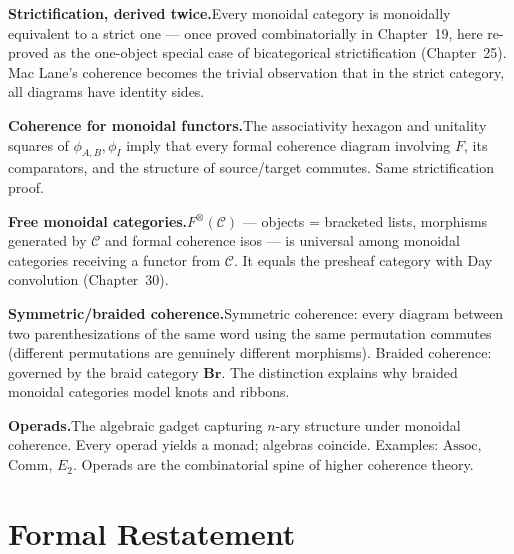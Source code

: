 \begin{summarybox}
\textbf{Strictification, derived twice.}\quad Every monoidal category is
monoidally equivalent to a strict one — once proved combinatorially in
Chapter~19, here re-proved as the one-object special case of bicategorical
strictification (Chapter~25). Mac Lane's coherence becomes the trivial
observation that in the strict category, all diagrams have identity sides.

\textbf{Coherence for monoidal functors.}\quad The associativity hexagon and
unitality squares of $\phi_{A,B}, \phi_I$ imply that every formal coherence
diagram involving $F$, its comparators, and the structure of source/target
commutes. Same strictification proof.

\textbf{Free monoidal categories.}\quad $F^\otimes(\mathcal{C})$ — objects =
bracketed lists, morphisms generated by $\mathcal{C}$ and formal coherence
isos — is universal among monoidal categories receiving a functor from
$\mathcal{C}$. It equals the presheaf category with Day convolution
(Chapter~30).

\textbf{Symmetric/braided coherence.}\quad Symmetric coherence: every diagram
between two parenthesizations of the same word using the same permutation
commutes (different permutations are genuinely different morphisms). Braided
coherence: governed by the braid category $\mathbf{Br}$. The distinction
explains why braided monoidal categories model knots and ribbons.

\textbf{Operads.}\quad The algebraic gadget capturing $n$-ary structure
under monoidal coherence. Every operad yields a monad; algebras coincide.
Examples: $\mathrm{Assoc}$, $\mathrm{Comm}$, $E_2$. Operads are the
combinatorial spine of higher coherence theory.
\end{summarybox}


\section*{Formal Restatement}

